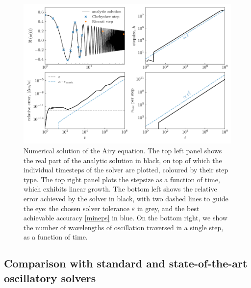 \documentclass[10pt]{article}
\newcommand{\veps}{\varepsilon}
\newcommand{\om}{\omega}
\begin{document}
\begin{figure}[tb]
    \centering
    \includegraphics{plots/airy-numsol.pdf}
    \caption{\label{airy-results} Numerical solution of the Airy equation. The
    top left panel shows the real part of the analytic solution in black, on
    top of which the individual timesteps of the solver are plotted, coloured
    by their step type. The top right panel plots the stepsize as a function of
    time, which exhibits linear growth. The bottom left shows the relative
    error achieved by the solver in black, with two dashed lines to guide the
    eye: the chosen solver tolerance $\veps$ in grey, and the
    best achievable accuracy \eqref{mineps}
    in blue. On the
    bottom right, we show the number of wavelengths of oscillation traversed in
    a single step, as a function of time. 
    }
\end{figure}


\subsection{Comparison with standard and state-of-the-art oscillatory solvers \label{solvercomp}}
\end{document}
